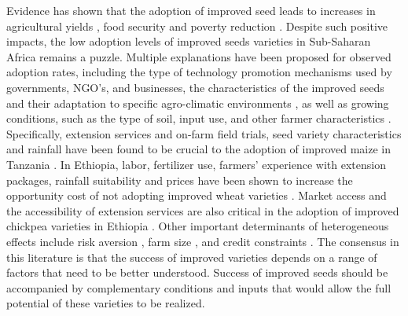 \documentclass{article}
\begin{document}
Evidence has shown that the adoption of improved seed leads to increases in agricultural yields \citep{Carter2014-fm}, food security \citep{Shiferaw2014-op} and poverty reduction \citep{Minten2008-tj}. Despite such positive impacts, the low adoption levels of improved seeds varieties in Sub-Saharan Africa remains a puzzle. Multiple explanations have been proposed for observed adoption rates, including the type of technology promotion mechanisms used by governments, NGO’s, and businesses, the characteristics of the improved seeds and their adaptation to specific agro-climatic environments \citep{Bird2020-nt}, as well as growing conditions, such as the type of soil, input use, and other farmer characteristics \citep{Munshi2004-og}. Specifically, extension services and on-farm field trials, seed variety characteristics and rainfall have been found to be crucial to the adoption of improved maize in Tanzania \citep{Kaliba2000-jh}. In Ethiopia, labor, fertilizer use, farmers’ experience with extension packages, rainfall suitability and prices have been shown to increase the opportunity cost of not adopting improved wheat varieties \citep{Wale2006-bv}. Market access and the accessibility of extension services are also critical in the adoption of improved chickpea varieties in Ethiopia \citep{Verkaart2019-ol}. Other important determinants of heterogeneous effects include risk aversion \citep{Holden2016-vy}, farm size \citep{Ghimire2015-bd}, and credit constraints \citep{Simtowe2008-jn,Balana2020-hx}. The consensus in this literature is that the success of improved varieties depends on a range of factors that need to be better understood. Success of improved seeds should be accompanied by complementary conditions and inputs that would allow the full potential of these varieties to be realized.
\end{document}
